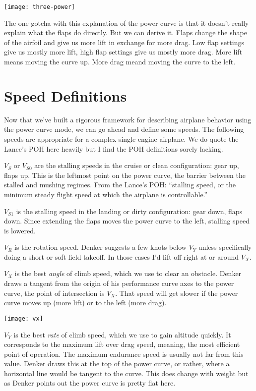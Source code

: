 \texttt{[image: three-power]}

The one gotcha with this explanation of the power curve is that it doesn't really explain what the flaps do directly. But we can derive it. Flaps change the shape of the airfoil and give us more lift in exchange for more drag. Low flap settings give us mostly more lift, high flap settings give us mostly more drag. More lift means moving the curve up. More drag meand moving the curve to the left.

\section{Speed Definitions}

Now that we've built a rigorous framework for describing airplane behavior using the power curve mode, we can go ahead and define some speeds. The following speeds are appropriate for a complex single engine airplane. We do quote the Lance's POH here heavily but I find the POH definitions sorely lacking.

$V_S$ or $V_{S0}$ are the stalling speeds in the cruise or clean configuration: gear up, flaps up. This is the leftmost point on the power curve, the barrier between the stalled and mushing regimes. From the Lance's POH: ``stalling speed, or the minimum steady flight speed at which the airplane is controllable.''

$V_{S1}$ is the stalling speed in the landing or dirty configuration: gear down, flaps down. Since extending the flaps moves the power curve to the left, stalling speed is lowered.

$V_R$ is the rotation speed. Denker suggests a few knots below $V_Y$ unless specifically doing a short or soft field takeoff. In those cases I'd lift off right at or around $V_X$.

$V_X$ is the best \emph{angle} of climb speed, which we use to clear an obstacle. Denker draws a tangent from the origin of his performance curve axes to the power curve, the point of intersection is $V_X$. That speed will get slower if the power curve moves up (more lift) or to the left (more drag).

\texttt{[image: vx]}

$V_Y$ is the best \emph{rate} of climb speed, which we use to gain altitude quickly. It corresponds to the maximum lift over drag speed, meaning, the most efficient point of operation. The maximum endurance speed is usually not far from this value. Denker draws this at the top of the power curve, or rather, where a horizontal line would be tangent to the curve. This does change with weight but as Denker points out the power curve is pretty flat here.

